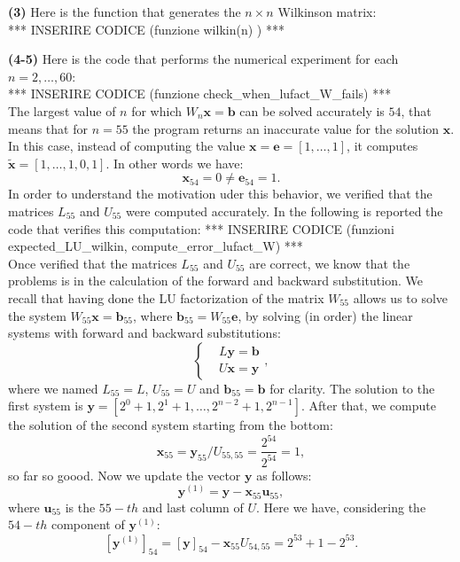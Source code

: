 \documentclass[a4paper]{report}
\numberwithin{equation}{chapter}
\begin{document}
	
\noindent \textbf{(3)} Here is the function that generates the $n \times n $ Wilkinson matrix:\\
*** INSERIRE CODICE (funzione wilkin(n) ) ***


\noindent \textbf{(4-5)} Here is the code that performs the numerical experiment for each $n=2,\dots,60$:\\
*** INSERIRE CODICE (funzione check\_when\_lufact\_W\_fails) ***\\

\noindent The largest value of $n$ for which $W_n \textbf{x} = \textbf{b}$ can be solved accurately is $54$, that means that for $n=55$ the program returns an inaccurate value for the solution $\textbf{x}$. In this case, instead of computing the value $\textbf{x} = \textbf{e} = [1,\dots,1]$, it computes $\tilde{\textbf{x}} = [1,\dots,1,0,1]$. In other words we have:
\begin{equation}\label{key}
	\textbf{x}_{54} = 0 \neq \textbf{e}_{54} = 1.
\end{equation}
In order to understand the motivation uder this behavior, we verified that the matrices $L_{55}$ and $U_{55}$ were computed accurately. In the following is reported the code that verifies this computation:
*** INSERIRE CODICE (funzioni expected\_LU\_wilkin, compute\_error\_lufact\_W) ***\\

\noindent  Once verified that the matrices $L_{55}$ and $U_{55}$ are correct, we know that the problems is in the calculation of the forward and backward substitution. We recall that having done the LU factorization of the matrix $W_{55}$ allows us to solve the system $W_{55} \textbf{x} = \textbf{b}_{55}$, where $\textbf{b}_{55} = W_{55} \textbf{e}$, by solving (in order) the linear systems with forward and backward substitutions:
\begin{equation}\label{key}
	\left\lbrace \begin{split}
		& L \textbf{y} = \textbf{b} \\
		& U \textbf{x} = \textbf{y}
	\end{split} \right. ,
\end{equation}
where we named $L_{55} = L$, $U_{55} = U$ and $\textbf{b}_{55} = \textbf{b}$ for clarity.
The solution to the first system is $\textbf{y} = [2^0 + 1, 2^1 + 1, \dots,2^{n-2}+1, 2^{n-1}]$. After that, we compute the solution of the second system starting from the bottom:
\begin{equation}\label{key}
	\textbf{x}_{55} = \textbf{y}_{55}/U_{55,55} = \frac{2^{54}}{2^{54}} = 1,
\end{equation}
so far so goood. Now we update the vector $\textbf{y}$ as follows:
\begin{equation}\label{key}
	\textbf{y}^{(1)} = \textbf{y} - \textbf{x}_{55} \textbf{u}_{55},
\end{equation}
where $\textbf{u}_{55}$ is the $55-th$ and last column of $U$. Here we have, considering the $54-th$ component of $\textbf{y}^{(1)}$:
\begin{equation}\label{key}
	[\textbf{y}^{(1)}]_{54} = [\textbf{y}]_{54} - \textbf{x}_{55} U_{54,55} = 2^{53} + 1 - 2^{53}.
\end{equation}
	
\end{document}
